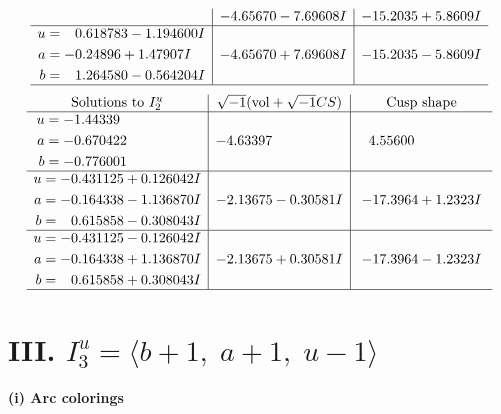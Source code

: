 \documentclass[1p]{elsarticle_modified}
\theoremstyle{definition}
\newcommand{\I}{\sqrt{-1}}
\begin{document}
$$\begin{array}{c|c|c}
 & -4.65670 - 7.69608 I & -15.2035 + 5.8609 I \\ \hline\begin{aligned}
u &= \phantom{-}0.618783 - 1.194600 I \\
a &= -0.24896 + 1.47907 I \\
b &= \phantom{-}1.264580 - 0.564204 I\end{aligned}
 & -4.65670 + 7.69608 I & -15.2035 - 5.8609 I\\
 \hline 
 \end{array}$$\newpage$$\begin{array}{c|c|c}  
\text{Solutions to }I^u_{2}& \I (\text{vol} + \sqrt{-1}CS) & \text{Cusp shape}\\
 \hline 
\begin{aligned}
u &= -1.44339\phantom{ +0.000000I} \\
a &= -0.670422\phantom{ +0.000000I} \\
b &= -0.776001\phantom{ +0.000000I}\end{aligned}
 & -4.63397\phantom{ +0.000000I} & \phantom{-}4.55600\phantom{ +0.000000I} \\ \hline\begin{aligned}
u &= -0.431125 + 0.126042 I \\
a &= -0.164338 - 1.136870 I \\
b &= \phantom{-}0.615858 - 0.308043 I\end{aligned}
 & -2.13675 - 0.30581 I & -17.3964 + 1.2323 I \\ \hline\begin{aligned}
u &= -0.431125 - 0.126042 I \\
a &= -0.164338 + 1.136870 I \\
b &= \phantom{-}0.615858 + 0.308043 I\end{aligned}
 & -2.13675 + 0.30581 I & -17.3964 - 1.2323 I\\
 \hline 
 \end{array}$$\newpage\newpage\renewcommand{\arraystretch}{1}
\centering \section*{III. $I^u_{3}= \langle b+1,\;a+1,\;u-1 \rangle$}
\flushleft \textbf{(i) Arc colorings}\\
\end{document}
